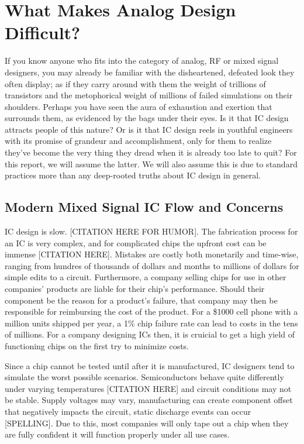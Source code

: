 \chapter{What Makes Analog Design Difficult?}

If you know anyone who fits into the category of analog, RF or mixed signal designers, you may already be familiar with the disheartened, defeated look they often display; as if they carry around with them the weight of trillions of transistors and the metophorical weight of millions of failed simulations on their shoulders. Perhaps you have seen the aura of exhaustion and exertion that surrounds them, as evidenced by the bags under their eyes. Is it that IC design attracts people of this nature? Or is it that IC design reels in youthful engineers with its promise of grandeur and accomplishment, only for them to realize they've become the very thing they dread when it is already too late to quit? For this report, we will assume the latter. We will also assume this is due to standard practices more than any deep-rooted truths about IC design in general.

\section{Modern Mixed Signal IC Flow and Concerns}
IC design is slow. [CITATION HERE FOR HUMOR]. The fabrication process for an IC is very complex, and for complicated chips the upfront cost can be immense [CITATION HERE]. Mistakes are costly both monetarily and time-wise, ranging from hundres of thousands of dollars and months to millions of dollars for simple edits to a circuit. Furthermore, a company selling chips for use in other companies' products are liable for their chip's performance. Should their component be the reason for a product's failure, that company may then be responsible for reimbursing the cost of the product. For a \$1000 cell phone with a million units shipped per year, a 1\% chip failure rate can lead to costs in the tens of millions. For a company designing ICs then, it is cruicial to get a high yield of functioning chips on the first try to minimize costs.

Since a chip cannot be tested until after it is manufactured, IC designers tend to simulate the worst possible scenarios. Semiconductors behave quite differently under varying temperatures [CITATION HERE] and circuit conditions may not be stable. Supply voltages may vary, manufacturing can create component offset that negatively impacts the circuit, static discharge events can occur [SPELLING]. Due to this, most companies will only tape out a chip when they are fully confident it will function properly under all use cases. 

